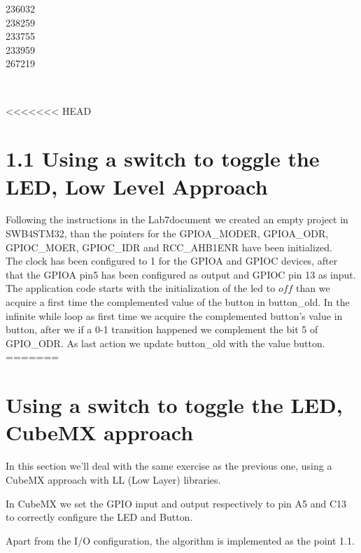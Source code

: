 \documentclass[12pt]{article}
\begin{document}
\begin{titlepage}
\begin{minipage}{0.4\textwidth}
			\begin{flushright} \large
			236032\\													%
			238259\\
            233755\\
            233959\\
            267219\\
            
		\end{flushright}
        
	\end{minipage}\\[2 cm]
	
\end{titlepage}

\newpage


<<<<<<< HEAD
\section{1.1 Using a switch to toggle the LED, Low Level Approach}
Following the instructions in the Lab7document we created an empty project in SWB4STM32, than the pointers for the GPIOA\_MODER, GPIOA\_ODR, GPIOC\_MOER, GPIOC\_IDR and RCC\_AHB1ENR have been initialized. \\
The clock has been configured to 1 for the GPIOA and GPIOC devices, after that the GPIOA pin5 has been configured as output and GPIOC pin 13 as input.\\
The application code starts with the initialization of the led to $off$ than we acquire a first time the complemented value of the button in button\_old. In the infinite while loop as first time we acquire the complemented button's value in button, after we if a 0-1 transition happened we complement the bit 5 of GPIO\_ODR. As last action we update button\_old with the value button.
=======
\section{Using a switch to toggle the LED, CubeMX approach}
In this section we'll deal with the same exercise as the previous one, using a CubeMX approach with LL (Low Layer) libraries. 

In CubeMX we set the GPIO input and output respectively to pin A5 and C13 to correctly configure the LED and Button.

Apart from the I/O configuration, the algorithm is implemented as the point 1.1.
\end{document}
